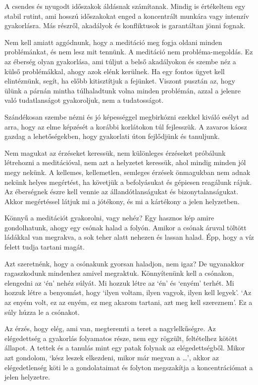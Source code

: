 \clearpage
\normalpagelayout

A csendes és nyugodt időszakok áldásnak számítanak. Mindig is értékeltem
egy stabil rutint, ami hosszú időszakokat enged a koncentrált munkára
vagy intenzív gyakorlásra. Más részről, akadályok és konfliktusok is
garantáltan jönni fognak.

Nem kell amiatt aggódnunk, hogy a meditáció meg fogja oldani minden
problémánkat, és nem lesz mit tennünk. A meditáció nem
probléma-megoldás. Ez az éberség olyan gyakorlása, ami túljut a belső
akadályokon és szembe néz a külső problémákkal, ahogy azok elénk
kerülnek. Ha egy fontos ügyet kell elintéznünk, segít, ha előbb
kitisztítjuk a fejünket. Viszont pusztán az, hogy ülünk a párnán mintha
túlhaladtunk volna minden problémán, azzal a jelenre való tudatlanságot
gyakoroljuk, nem a tudatosságot.

Szándékosan szembe nézni és jó képességgel megbirkózni ezekkel kiváló
esélyt ad arra, hogy az elme képzését a korábbi korlátokon túl
fejlesszük. A zavaros káosz gazdag a lehetőségekben, hogy gyakorlati
úton fejlődjünk és tanuljunk.

Nem magukat az érzéseket keressük, nem különleges érzéseket próbálunk
létrehozni a meditációval, nem azt a helyzetet keressük, ahol mindig
minden jól megy nekünk. A kellemes, kellemetlen, semleges érzések
önmagukban nem adnak nekünk helyes megértést, ha követjük a befolyásukat
és gépiesen reagálunk rájuk. Az éberségnek észre kell vennie az
állandótlanságukat és bizonytalanságukat. Akkor megértéssel látjuk mi a
jótékony, és mi a kártékony a jelen helyzetben.

\clearpage


Könnyű a meditációt gyakorolni, vagy nehéz? Egy hasznos kép amire
gondolhatunk, ahogy egy csónak halad a folyón. Amikor a csónak áruval
töltött ládákkal van megrakva, a sok teher alatt nehezen és lassan
halad. Épp, hogy a víz felett tudja tartani magát.

Azt szeretnénk, hogy a csónakunk gyorsan haladjon, nem igaz? De
ugyanakkor ragaszkodunk mindenhez amivel megraktuk. Könnyítenünk kell a
csónakon, elengedni az `én' nehéz súlyát. Mi hozzuk létre az `én' és
`enyém' terhét. Mi hozzuk létre a benyomást, hogy `ilyen voltam, ilyen
vagyok, ilyen kell legyek'. `Az az enyém volt, ez az enyém, ez meg
akarom tartani, azt meg kell szereznem'. Ez a súly húzza le a csónakot.

Az érzés, hogy elég, ami van, megteremti a teret a nagylelkűségre. Az
elégedettség a gyakorlás folyamatos része, nem egy rögzült, feltételhez
kötött állapot. A tettek és a tanulás mint egy patak folynak az
elégedettségből. Mikor azt gondolom, `kész leszek elkezdeni, mikor már
megvan a \ldots{}', akkor az elégedetlenség köti le a gondolataimat és
folyton megszakítja a koncentrációmat a jelen helyzetre.

